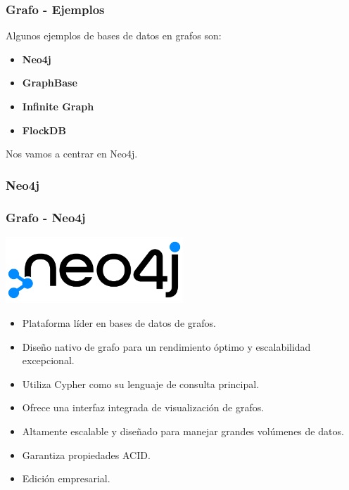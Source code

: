 \begin{frame}
    \frametitle{Grafo - Ejemplos}

    Algunos ejemplos de bases de datos en grafos son:

    \begin{itemize}
        \item \textbf{Neo4j}\\
         
        \item \textbf{GraphBase}\\ 

        \item \textbf{Infinite Graph}\\
        
        \item \textbf{FlockDB}\\
    \end{itemize}
    
     

    Nos vamos a centrar en Neo4j.
    
\end{frame}

\subsubsection{Neo4j}

\begin{frame}
    \frametitle{Grafo - Neo4j}

    \centering
    \includegraphics[width=0.5\textwidth]{images/neo4j-logo.png}

    \begin{itemize}
        \item Plataforma líder en bases de datos de grafos.  
        \item Diseño nativo de grafo para un rendimiento óptimo y escalabilidad excepcional.  
        \item Utiliza Cypher como su lenguaje de consulta principal.  
        \item Ofrece una interfaz integrada de visualización de grafos.  
        \item Altamente escalable y diseñado para manejar grandes volúmenes de datos.  
        \item Garantiza propiedades ACID.  
        \item Edición empresarial.
    \end{itemize}
    
\end{frame}

